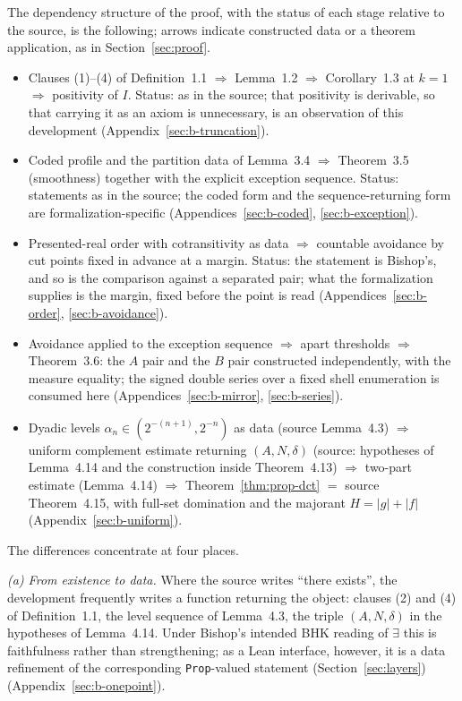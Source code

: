 \documentclass[11pt]{article}
\theoremstyle{definition}
\theoremstyle{remark}
\begin{document}
The dependency structure of the proof, with the status of each stage relative to the source, is the following; arrows indicate constructed data or a theorem application, as in Section~\ref{sec:proof}.
\begin{itemize}[leftmargin=2em]
\item Clauses (1)--(4) of Definition~1.1 $\Rightarrow$ Lemma~1.2 $\Rightarrow$ Corollary~1.3 at $k=1$ $\Rightarrow$ positivity of $I$.  Status: as in the source; that positivity is derivable, so that carrying it as an axiom is unnecessary, is an observation of this development (Appendix~\ref{sec:b-truncation}).
\item Coded profile and the partition data of Lemma~3.4 $\Rightarrow$ Theorem~3.5 (smoothness) together with the explicit exception sequence.  Status: statements as in the source; the coded form and the sequence-returning form are formalization-specific (Appendices~\ref{sec:b-coded}, \ref{sec:b-exception}).
\item Presented-real order with cotransitivity as data $\Rightarrow$ countable avoidance by cut points fixed in advance at a margin.  Status: the statement is Bishop's, and so is the comparison against a separated pair; what the formalization supplies is the margin, fixed before the point is read (Appendices~\ref{sec:b-order}, \ref{sec:b-avoidance}).
\item Avoidance applied to the exception sequence $\Rightarrow$ apart thresholds $\Rightarrow$ Theorem~3.6: the $A$ pair and the $B$ pair constructed independently, with the measure equality; the signed double series over a fixed shell enumeration is consumed here (Appendices~\ref{sec:b-mirror}, \ref{sec:b-series}).
\item Dyadic levels $\alpha_n\in(2^{-(n+1)},2^{-n})$ as data (source Lemma~4.3) $\Rightarrow$ uniform complement estimate returning $(A,N,\delta)$ (source: hypotheses of Lemma~4.14 and the construction inside Theorem~4.13) $\Rightarrow$ two-part estimate (Lemma~4.14) $\Rightarrow$ Theorem~\ref{thm:prop-dct} $=$ source Theorem~4.15, with full-set domination and the majorant $H=|g|+|f|$ (Appendix~\ref{sec:b-uniform}).
\end{itemize}

The differences concentrate at four places.

\emph{(a) From existence to data.}  Where the source writes ``there exists'', the development frequently writes a function returning the object: clauses (2) and (4) of Definition~1.1, the level sequence of Lemma~4.3, the triple $(A,N,\delta)$ in the hypotheses of Lemma~4.14.  Under Bishop's intended BHK reading of $\exists$ this is faithfulness rather than strengthening; as a Lean interface, however, it is a data refinement of the corresponding \texttt{Prop}-valued statement (Section~\ref{sec:layers}) (Appendix~\ref{sec:b-onepoint}).
\end{document}
